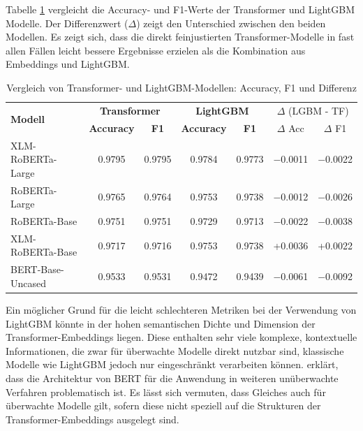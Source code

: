 Tabelle \ref{tab:transformer_vs_lightgbm} vergleicht die Accuracy- und F1-Werte der Transformer und LightGBM Modelle.
Der Differenzwert ($\Delta$) zeigt den Unterschied zwischen den beiden Modellen.
Es zeigt sich, dass die direkt feinjustierten Transformer-Modelle in fast allen Fällen leicht bessere Ergebnisse erzielen als die Kombination aus 
Embeddings und LightGBM.

\begin{table}[!ht]
\centering
\begin{tabular}{lcccccc}
    \toprule
    \multirow{2}{*}{\textbf{Modell}} &
    \multicolumn{2}{c}{\textbf{Transformer}} &
    \multicolumn{2}{c}{\textbf{LightGBM}} &
    \multicolumn{2}{c}{$\Delta$ (LGBM - TF)} \\
    \cmidrule(lr){2-3} \cmidrule(lr){4-5} \cmidrule(l){6-7}
    & \textbf{Accuracy} & \textbf{F1} & \textbf{Accuracy} & \textbf{F1} & $\Delta$ Acc & $\Delta$ F1 \\
    \midrule
    XLM-RoBERTa-Large & 0.9795 & 0.9795 & 0.9784 & 0.9773 & $-$0.0011 & $-$0.0022 \\
    RoBERTa-Large     & 0.9765 & 0.9764 & 0.9753 & 0.9738 & $-$0.0012 & $-$0.0026 \\
    RoBERTa-Base      & 0.9751 & 0.9751 & 0.9729 & 0.9713 & $-$0.0022 & $-$0.0038 \\
    XLM-RoBERTa-Base  & 0.9717 & 0.9716 & 0.9753 & 0.9738 & +0.0036 & +0.0022 \\
    BERT-Base-Uncased & 0.9533 & 0.9531 & 0.9472 & 0.9439 & $-$0.0061 & $-$0.0092 \\
    \bottomrule
\end{tabular}
\caption{Vergleich von Transformer- und LightGBM-Modellen: Accuracy, F1 und Differenz}
\label{tab:transformer_vs_lightgbm}
\end{table}

Ein möglicher Grund für die leicht schlechteren Metriken bei der Verwendung von LightGBM könnte in der hohen semantischen Dichte und Dimension der 
Transformer-Embeddings liegen. Diese enthalten sehr viele komplexe, kontextuelle Informationen, die zwar für überwachte Modelle direkt nutzbar sind, 
klassische Modelle wie LightGBM jedoch nur eingeschränkt verarbeiten können.
\cite{reimers-gurevych-2019-sentence} erklärt, dass die Architektur von BERT für die Anwendung in weiteren unüberwachte Verfahren problematisch ist.
Es lässt sich vermuten, dass Gleiches auch für überwachte Modelle gilt, 
sofern diese nicht speziell auf die Strukturen der Transformer-Embeddings ausgelegt sind.

